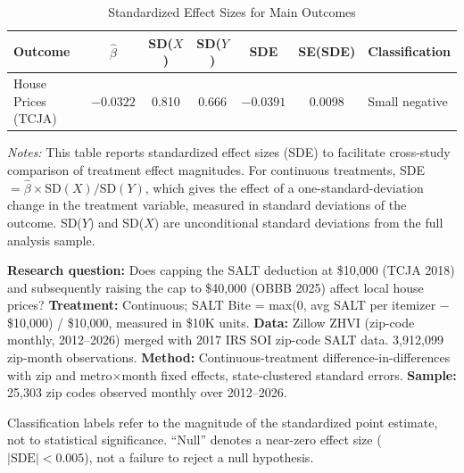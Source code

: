 \begin{table}[H]
\centering
\caption{Standardized Effect Sizes for Main Outcomes}
\label{tab:sde}
{\small
\begin{tabular}{lcccccl}
\toprule
Outcome & $\hat{\beta}$ & SD($X$) & SD($Y$) & SDE & SE(SDE) & Classification \\
\midrule
House Prices (TCJA) & $-0.0322$ & 0.810 & 0.666 & $-0.0391$ & 0.0098 & Small negative \\
\bottomrule
\end{tabular}}
\par\vspace{0.3em}
{\footnotesize \emph{Notes:} This table reports standardized effect sizes (SDE) to facilitate cross-study comparison of treatment effect magnitudes. For continuous treatments, SDE $= \hat{\beta} \times \text{SD}(X) / \text{SD}(Y)$, which gives the effect of a one-standard-deviation change in the treatment variable, measured in standard deviations of the outcome. SD($Y$) and SD($X$) are unconditional standard deviations from the full analysis sample.

\textbf{Research question:} Does capping the SALT deduction at \$10,000 (TCJA 2018) and subsequently raising the cap to \$40,000 (OBBB 2025) affect local house prices? \textbf{Treatment:} Continuous; SALT Bite = max(0, avg SALT per itemizer $-$ \$10,000) / \$10,000, measured in \$10K units. \textbf{Data:} Zillow ZHVI (zip-code monthly, 2012--2026) merged with 2017 IRS SOI zip-code SALT data. 3,912,099 zip-month observations. \textbf{Method:} Continuous-treatment difference-in-differences with zip and metro$\times$month fixed effects, state-clustered standard errors. \textbf{Sample:} 25,303 zip codes observed monthly over 2012--2026.

Classification labels refer to the magnitude of the standardized point estimate, not to statistical significance. ``Null'' denotes a near-zero effect size ($|\text{SDE}| < 0.005$), not a failure to reject a null hypothesis.}
\end{table}
